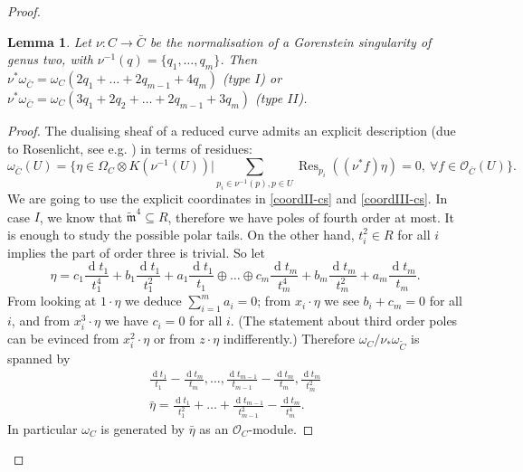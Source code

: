 \documentclass[11pt]{amsart}
\newcommand{\tm}{\widetilde{\mathfrak m}}
\newcommand{\OO}{\mathcal O}
\renewcommand{\to}{\rightarrow}
\theoremstyle{plain}
\newtheorem{lem}[thm]{Lemma}
\theoremstyle{definition}
\begin{document}
\begin{proof}
\begin{lem}\label{lem:dualising_lb}
 Let $\nu\colon C\to \bar C$ be the normalisation of a Gorenstein singularity of genus two, with $\nu^{-1}(q)=\{q_1,\ldots,q_m\}$. Then  $\nu^*\omega_{\bar C}=\omega_C(2q_1+\ldots+2q_{m-1}+4q_m)$ (type $I$) or $\nu^*\omega_{\bar C}=\omega_C(3q_1+2q_2+\ldots+2q_{m-1}+3q_m)$ (type $I\!I$).
\end{lem}
\begin{proof}
 The dualising sheaf of a reduced curve admits an explicit description (due to Rosenlicht, see e.g. \cite[Proposition VIII.1.16]{AK}) in terms of residues:
 \[\omega_{\bar C}(U)=\{\eta\in \Omega_{C}\otimes K(\nu^{-1}(U)) | \sum_{p_i\in\nu^{-1}(p),p\in U}\operatorname{Res}_{p_i}((\nu^*f)\eta)=0,\ \forall f\in\OO_{\bar C}(U)\}.\]
 We are going to use the explicit coordinates in \eqref{coordII-cs} and \eqref{coordIII-cs}.
 In case $I$, we know that $\tm^4\subseteq R$, therefore we have poles of fourth order at most. It is enough to study the possible polar tails. On the other hand, $t_i^2\in R$ for all $i$ implies the part of order three is trivial. So let \[\eta=c_1\frac{\operatorname{d}t_1}{t_1^4}+b_1\frac{\operatorname{d}t_1}{t_1^2}+a_1\frac{\operatorname{d}t_1}{t_1}\oplus\ldots\oplus c_m\frac{\operatorname{d}t_m}{t_m^4}+b_m\frac{\operatorname{d}t_m}{t_m^2}+a_m\frac{\operatorname{d}t_m}{t_m}.\]
 From looking at $1\cdot\eta$ we deduce $\sum_{i=1}^m a_i=0$; from $x_i\cdot\eta$ we see $b_i+c_m=0$ for all $i$, and from $x_i^3\cdot\eta$ we have $c_i=0$ for all $i$. (The statement about third order poles can be evinced from $x_i^2\cdot\eta$ or from $z\cdot\eta$ indifferently.) Therefore $\omega_C/\nu_*\omega_{\tilde C}$ is spanned by
 \begin{align*}
  \frac{\operatorname{d}t_1}{t_1}-\frac{\operatorname{d}t_m}{t_m},\ldots,\frac{\operatorname{d}t_{m-1}}{t_{m-1}}-\frac{\operatorname{d}t_m}{t_m},\frac{\operatorname{d}t_m}{t_m^2}\\
  \bar{\eta}=\frac{\operatorname{d}t_1}{t_1^2}+\ldots+\frac{\operatorname{d}t_{m-1}}{t_{m-1}^2}-\frac{\operatorname{d}t_m}{t_m^4}.
 \end{align*}
In particular $\omega_C$ is generated by $\bar{\eta}$ as an $\OO_C$-module. 


\end{proof}
\end{proof}
\end{document}
